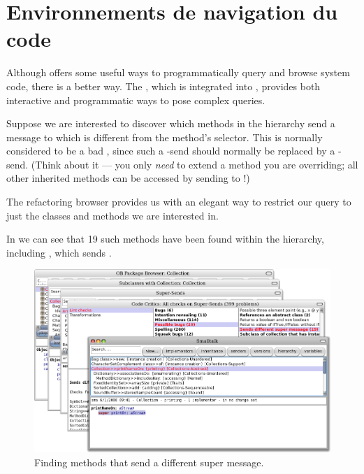 \documentclass[a4paper,10pt,twoside]{book}
\begin{document}
\section{Environnements de navigation du code}

Although  offers some useful ways to programmatically query and browse system code, there is a better way.  The , which is integrated into \pharo, provides both interactive and programmatic ways to pose complex queries.

Suppose we are interested to discover which methods in the  hierarchy send a message to \super which is different from the method's selector.
This is normally considered to be a bad , since such a \super-send should normally be replaced by a \self-send. (Think about it --- you only \emph{need} \super to extend a method you are overriding; all other inherited methods can be accessed by sending to \self!)

The refactoring browser provides us with an elegant way to restrict our query to just the classes and methods we are interested in.


In  we can see that 19 such methods have been found within the  hierarchy, including , which sends .
\begin{figure}[ht]\centering
	\includegraphics[width=\linewidth]{sendDifferentSuper}
	\caption{Finding methods that send a different super message.}
\end{figure}
\end{document}
